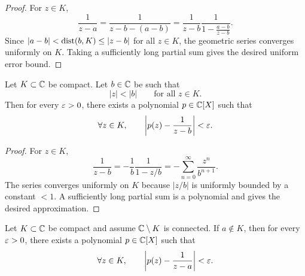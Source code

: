 \begin{proof}
    For \(z \in K\),
    \[
      \frac{1}{z-a}
      =
      \frac{1}{z-b-(a-b)}
      =
      \frac{1}{z-b}
      \frac{1}{1-\frac{a-b}{z-b}} .
    \]
    Since \(|a-b| < \operatorname{dist}(b,K) \le |z-b|\) for all \(z \in K\), the geometric
    series converges uniformly on \(K\). Taking a sufficiently long partial sum
    gives the desired uniform error bound.
\end{proof}

\begin{lemma}
    \label{lem:far_pole_polynomial}
    \leanok
    Let \(K \subset \mathbb{C}\) be compact. Let \(b \in \mathbb{C}\) be such that
    \[
      |z| < |b|
      \qquad \text{for all } z \in K .
    \]
    Then for every \(\varepsilon > 0\), there exists a polynomial \(p \in \mathbb{C}[X]\) such that
    \[
      \forall z \in K,\qquad
      \left|p(z)-\frac{1}{z-b}\right| < \varepsilon .
    \]
\end{lemma}

\begin{proof}
    For \(z \in K\),
    \[
      \frac{1}{z-b}
      =
      -\frac{1}{b}\frac{1}{1-z/b}
      =
      -\sum_{n=0}^{\infty} \frac{z^n}{b^{n+1}} .
    \]
    The series converges uniformly on \(K\) because \(|z/b|\) is uniformly bounded
    by a constant \(<1\). A sufficiently long partial sum is a polynomial and gives
    the desired approximation.
\end{proof}

\begin{proposition}
    \label{prop:single_pole_polynomial}
    \leanok
    Let \(K \subset \mathbb{C}\) be compact and assume \(\mathbb{C} \setminus K\) is connected. If
    \(a \notin K\), then for every \(\varepsilon > 0\), there exists a polynomial
    \(p \in \mathbb{C}[X]\) such that
    \[
      \forall z \in K,\qquad
      \left|p(z)-\frac{1}{z-a}\right| < \varepsilon .
    \]
\end{proposition}


